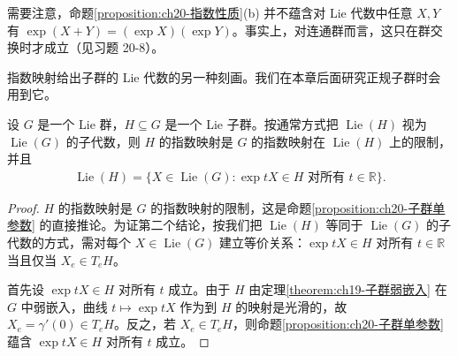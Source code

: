 \documentclass[../../main.tex]{subfiles}
\begin{document}
需要注意，命题\cref{proposition:ch20-指数性质}(b) 并不蕴含对 Lie 代数中任意 $X,Y$ 有 $\exp(X+Y)=(\exp X)(\exp Y)$。事实上，对连通群而言，这只在群交换时才成立（见习题 20-8）。

指数映射给出子群的 Lie 代数的另一种刻画。我们在本章后面研究正规子群时会用到它。

\begin{proposition}\label{proposition:ch20-子群Lie代数}
设 $G$ 是一个 Lie 群，$H\subseteq G$ 是一个 Lie 子群。按通常方式把 $\operatorname{Lie}(H)$ 视为 $\operatorname{Lie}(G)$ 的子代数，则 $H$ 的指数映射是 $G$ 的指数映射在 $\operatorname{Lie}(H)$ 上的限制，并且
\begin{align*}
\operatorname{Lie}(H)=\{X\in\operatorname{Lie}(G)\colon \exp tX\in H\text{ 对所有 }t\in\mathbb{R}\}.
\end{align*}
\end{proposition}

\begin{proof}
$H$ 的指数映射是 $G$ 的指数映射的限制，这是命题\cref{proposition:ch20-子群单参数} 的直接推论。为证第二个结论，按我们把 $\operatorname{Lie}(H)$ 等同于 $\operatorname{Lie}(G)$ 的子代数的方式，需对每个 $X\in\operatorname{Lie}(G)$ 建立等价关系：$\exp tX\in H$ 对所有 $t\in\mathbb{R}$ 当且仅当 $X_e\in T_eH$。

首先设 $\exp tX\in H$ 对所有 $t$ 成立。由于 $H$ 由定理\cref{theorem:ch19-子群弱嵌入} 在 $G$ 中弱嵌入，曲线 $t\mapsto\exp tX$ 作为到 $H$ 的映射是光滑的，故 $X_e=\gamma'(0)\in T_eH$。反之，若 $X_e\in T_eH$，则命题\cref{proposition:ch20-子群单参数} 蕴含 $\exp tX\in H$ 对所有 $t$ 成立。
\end{proof}
\end{document}

